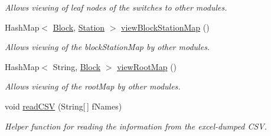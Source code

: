 \begin{DoxyCompactItemize}
\begin{DoxyCompactList}\small\item\em Allows viewing of leaf nodes of the switches to other modules. \end{DoxyCompactList}\item 
Hash\+Map$<$ \hyperlink{classTrackModel_1_1Block}{Block}, \hyperlink{classTrackModel_1_1Station}{Station} $>$ \hyperlink{classTrackModel_1_1TrackModel_a5bd341c8df3e0ad585f32e1587061f36}{view\+Block\+Station\+Map} ()
\begin{DoxyCompactList}\small\item\em Allows viewing of the block\+Station\+Map by other modules. \end{DoxyCompactList}\item 
Hash\+Map$<$ String, \hyperlink{classTrackModel_1_1Block}{Block} $>$ \hyperlink{classTrackModel_1_1TrackModel_aa070a8864c352ab49eae4c93aa88700f}{view\+Root\+Map} ()
\begin{DoxyCompactList}\small\item\em Allows viewing of the root\+Map by other modules. \end{DoxyCompactList}\item 
void \hyperlink{classTrackModel_1_1TrackModel_ab4deefd42535c2e06785eba4ed3989a1}{read\+C\+SV} (String\mbox{[}$\,$\mbox{]} f\+Names)
\begin{DoxyCompactList}\small\item\em Helper function for reading the information from the excel-\/dumped C\+SV. \end{DoxyCompactList}\end{DoxyCompactItemize}
